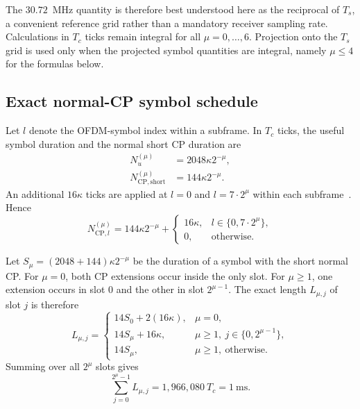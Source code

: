 \documentclass[11pt]{article}
\begin{document}
The $30.72$~MHz quantity is therefore best understood here as the reciprocal of $T_s$, a convenient reference grid rather than a mandatory receiver sampling rate.  Calculations in $T_c$ ticks remain integral for all $\mu=0,\ldots,6$.  Projection onto the $T_s$ grid is used only when the projected symbol quantities are integral, namely $\mu\leq4$ for the formulas below.

\subsection{Exact normal-CP symbol schedule}

Let $l$ denote the OFDM-symbol index within a subframe.  In $T_c$ ticks, the useful symbol duration and the normal short CP duration are
\begin{align}
    N_{u}^{(\mu)} &= 2048\kappa 2^{-\mu},\\
    N_{\mathrm{CP,short}}^{(\mu)} &= 144\kappa 2^{-\mu}.
    \label{eq:symbolbase}
\end{align}
An additional $16\kappa$ ticks are applied at $l=0$ and $l=7\cdot2^\mu$ within each subframe~\cite[Sec.~5.3.1]{etsi38211}.  Hence
\begin{equation}
N_{\mathrm{CP},l}^{(\mu)}=
144\kappa 2^{-\mu}+
\begin{cases}
16\kappa, & l\in\{0,7\cdot2^\mu\},\\
0, & \text{otherwise.}
\end{cases}
\label{eq:cp}
\end{equation}

Let $S_\mu=(2048+144)\kappa2^{-\mu}$ be the duration of a symbol with the short normal CP.  For $\mu=0$, both CP extensions occur inside the only slot.  For $\mu\geq1$, one extension occurs in slot 0 and the other in slot $2^{\mu-1}$.  The exact length $L_{\mu,j}$ of slot $j$ is therefore
\begin{equation}
L_{\mu,j}=
\begin{cases}
14S_0+2(16\kappa), & \mu=0,\\
14S_\mu+16\kappa, & \mu\geq1,\ j\in\{0,2^{\mu-1}\},\\
14S_\mu, & \mu\geq1,\ \text{otherwise.}
\end{cases}
\label{eq:slotlength}
\end{equation}
Summing over all $2^\mu$ slots gives
\begin{equation}
    \sum_{j=0}^{2^\mu-1}L_{\mu,j}=1{,}966{,}080\ T_c=1\ \text{ms}.
    \label{eq:subframe}
\end{equation}
\end{document}
